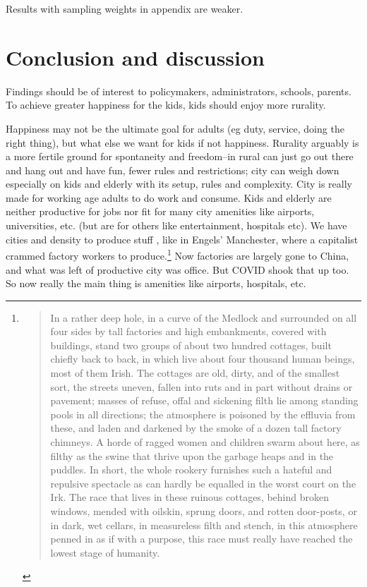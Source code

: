 \documentclass[10pt, letterpaper]{article}
\begin{document}
\begin{spacing}{1.4}
Results with sampling weights in appendix are weaker.

\section*{Conclusion and discussion}


Findings should be of interest to policymakers, administrators, schools,  parents. To achieve greater happiness for the kids, kids should enjoy more rurality.


Happiness may not be the ultimate goal for adults (eg duty, service, doing the right thing), but what else we want for kids if not happiness.
 Rurality arguably is a more fertile ground for  spontaneity and freedom--in
 rural can just go out there and hang out and have fun, fewer rules and
 restrictions; city can weigh down especially on kids and elderly with its
 setup, rules and complexity. City is really made for working age adults to do
 work and consume. Kids and elderly are neither productive for jobs nor fit for
 many city amenities like airports, universities, etc. (but are for others like
 entertainment, hospitals etc). 
%
We have cities and density to produce stuff \citep{osullivan09}, like in Engels'
Manchester, where a capitalist crammed factory workers to produce.\footnote{\begin{quote}
In a rather deep hole, in a curve
of the Medlock and surrounded on all four sides by tall factories and high embankments, covered with
buildings, stand two groups of about two hundred cottages, built chiefly back to back, in which live about four
thousand human beings, most of them Irish. The cottages are old, dirty, and of the smallest sort, the streets
uneven, fallen into ruts and in part without drains or pavement; masses of refuse, offal and sickening filth lie
among standing pools in all directions; the atmosphere is poisoned by the effluvia from these, and laden and
darkened by the smoke of a dozen tall factory chimneys. A horde of ragged women and children swarm about
here, as filthy as the swine that thrive upon the garbage heaps and in the puddles. In short, the whole rookery
furnishes such a hateful and repulsive spectacle as can hardly be equalled in the worst court on the Irk. The
race that lives in these ruinous cottages, behind broken windows, mended with oilskin, sprung doors, and
rotten door-posts, or in dark, wet cellars, in measureless filth and stench, in this atmosphere penned in as if
with a purpose, this race must really have reached the lowest stage of
humanity. \citep{engels87}
\end{quote}
} Now factories are largely gone to China, and what was left of productive city
was office. But COVID shook that up too. So now really the main thing is amenities like airports, hospitals, etc. 


\end{spacing}
\end{document}
